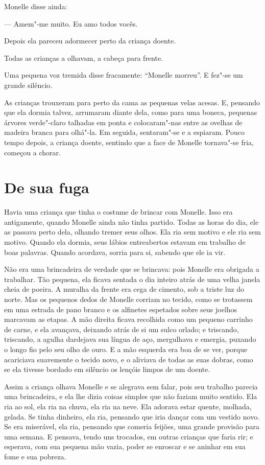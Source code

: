 Monelle disse ainda:

--- Amem"-me muito. Eu amo todos vocês.

Depois ela pareceu adormecer perto da criança doente.

Todas as crianças a olhavam, a cabeça para frente.

Uma pequena voz tremida disse fracamente: “Monelle morreu”. E fez"-se um
grande silêncio.

As crianças trouxeram para perto da cama as pequenas velas acesas. E,
pensando que ela dormia talvez, arrumaram diante dela, como para uma
boneca, pequenas árvores verde"-claro talhadas em ponta e colocaram"-nas
entre as ovelhas de madeira branca para olhá"-la. Em seguida, sentaram"-se e
a espiaram. Pouco tempo depois, a criança doente, sentindo que a face de
Monelle tornava"-se fria, começou a chorar.

\section*{De sua fuga}

Havia uma criança que tinha o costume de brincar com Monelle. Isso era
antigamente, quando Monelle ainda não tinha partido. Todas as horas do
dia, ele as passava perto dela, olhando tremer seus olhos. Ela ria sem
motivo e ele ria sem motivo. Quando ela dormia, seus lábios entreabertos
estavam em trabalho de boas palavras. Quando acordava, sorria para si,
sabendo que ele ia vir.

Não era uma brincadeira de verdade que se brincava: pois Monelle era
obrigada a trabalhar. Tão pequena, ela ficava sentada o dia inteiro atrás
de uma velha janela cheia de poeira. A muralha da frente era cega de
cimento, sob a triste luz do norte. Mas os pequenos dedos de Monelle
corriam no tecido, como se trotassem em uma estrada de pano branco e os
alfinetes espetados sobre seus joelhos marcavam as etapas. A mão direita
ficava recolhida como um pequeno carrinho de carne, e ela avançava,
deixando atrás de si um sulco orlado; e triscando, triscando, a agulha
dardejava sua língua de aço, mergulhava e emergia, puxando o longo fio
pelo seu olho de ouro. E a mão esquerda era boa de se ver, porque
acariciava suavemente o tecido novo, e o aliviava de todas as suas dobras,
como se ela tivesse bordado em silêncio os lençóis limpos de um doente.

Assim a criança olhava Monelle e se alegrava sem falar, pois seu
trabalho parecia uma brincadeira, e ela lhe dizia coisas simples que não
faziam muito sentido. Ela ria ao sol, ela ria na chuva, ela ria na neve.
Ela adorava estar quente, molhada, gelada. Se tinha dinheiro, ela ria,
pensando que iria dançar com um vestido novo. Se era miserável, ela ria,
pensando que comeria feijões, uma grande provisão para uma semana. E
pensava, tendo uns trocados, em outras crianças que faria rir; e esperava,
com sua pequena mão vazia, poder se enroscar e se aninhar em sua fome e
sua pobreza.

